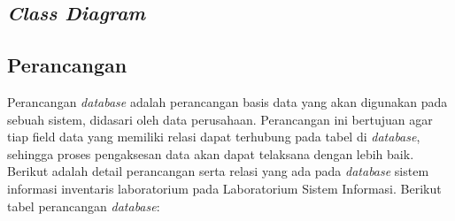 \subsection{\textit{Class Diagram}}
\subsection{Perancangan }
Perancangan \textit{database} adalah perancangan basis data yang akan digunakan pada sebuah sistem, didasari oleh data perusahaan. Perancangan ini bertujuan agar tiap field data yang memiliki relasi dapat terhubung pada tabel di \textit{database}, sehingga proses pengaksesan data akan dapat telaksana dengan lebih baik. Berikut adalah detail perancangan serta relasi yang ada pada \textit{database} sistem informasi inventaris laboratorium pada Laboratorium Sistem Informasi. Berikut tabel perancangan \textit{database}:

